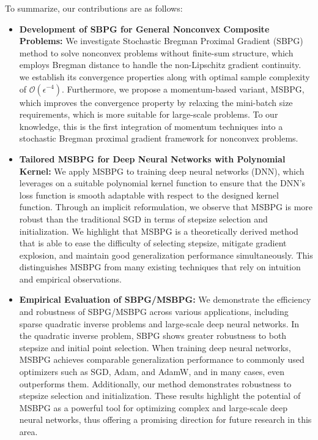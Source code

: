 \documentclass[twoside,11pt]{article}
\begin{document}
 To summarize, our contributions are as follows:
\begin{itemize}
    \item[1.] {\textbf{Development of SBPG for General Nonconvex Composite Problems:} We investigate Stochastic Bregman Proximal Gradient (SBPG) method to solve nonconvex problems without finite-sum structure, which employs Bregman distance to handle the non-Lipschitz gradient continuity. we establish its convergence properties along with optimal sample complexity of $\mathcal{O}(\epsilon^{-4})$. Furthermore, we propose a momentum-based variant, MSBPG, which improves the convergence property by relaxing the mini-batch size requirements, which is more suitable for large-scale problems. To our knowledge, this is the first integration of momentum techniques into a stochastic Bregman proximal gradient framework for nonconvex problems.}
    \item[2.] \textbf{Tailored MSBPG for Deep Neural Networks with Polynomial Kernel:} We apply MSBPG to training deep neural networks (DNN), which leverages on a suitable polynomial kernel function to ensure that the DNN's loss function is smooth adaptable with respect to the designed kernel function.  Through an implicit reformulation, we observe that MSBPG is more robust than the traditional SGD in terms of stepsize selection and initialization. We highlight that MSBPG is a theoretically derived method that is able to ease the difficulty of selecting stepsize, mitigate gradient explosion, and maintain good generalization performance simultaneously. This distinguishes MSBPG from many existing techniques that rely on intuition and empirical observations. 
    \item[3.] \textbf{Empirical Evaluation of SBPG/MSBPG:} We demonstrate the efficiency and robustness of SBPG/MSBPG across various applications, including sparse quadratic inverse problems and large-scale deep neural networks. In the quadratic inverse problem, SBPG shows greater robustness to both stepsize and initial point selection. When training deep neural networks, MSBPG achieves comparable generalization performance to commonly used optimizers such as SGD, Adam, and AdamW, and in many cases, even outperforms them. Additionally, our method demonstrates robustness to stepsize selection and initialization. These results highlight the potential of MSBPG as a powerful tool for optimizing complex and large-scale deep neural networks, thus offering a promising direction for future research in this area.  
\end{itemize}
\end{document}
